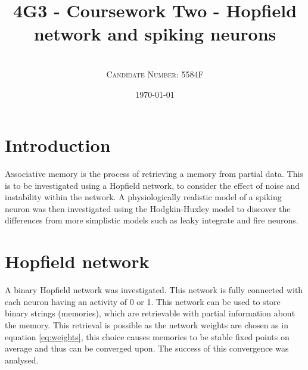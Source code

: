 \documentclass[twoside,twocolumn]{article}
\title{4G3 - Coursework Two -  Hopfield network and spiking neurons} %
\author{%
\\
\textsc{Candidate Number: 5584F} \\
}
\date{\today} %
\begin{document}
\onecolumn

\twocolumn
{}
\maketitle
\section{Introduction}

\lettrine[nindent=0em,lines=3]{A}ssociative memory is the process of retrieving a memory from partial data. This is to be investigated using a Hopfield network, to consider the effect of noise and instability within the network.
\newline
A physiologically realistic model of a spiking neuron was then investigated using the Hodgkin-Huxley model to discover the differences from more simplistic models such as leaky integrate and fire neurons. 


\section{Hopfield network}
A binary Hopfield network was investigated. This network is fully connected with each neuron having an activity of 0 or 1. This network can be used to store binary strings (memories), which are retrievable with partial information about the memory. This retrieval is possible as the network weights are chosen as in equation \ref{eq:weights}, this choice causes memories to be stable fixed points on average and thus can be converged upon. The success of this convergence was analysed.

\end{document}
